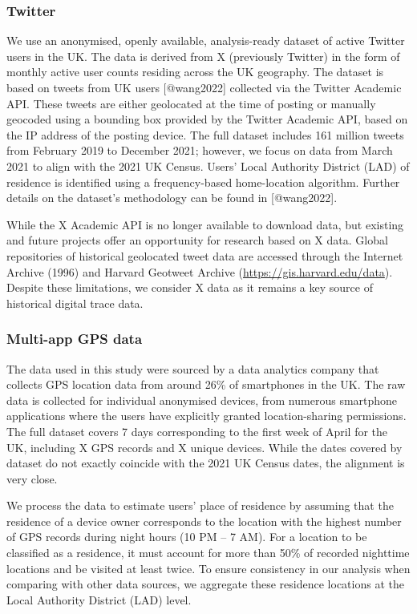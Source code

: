 \documentclass[]{rsos}%
\begin{document}
\subsubsection{Twitter}\label{twitter}

We use an anonymised, openly available, analysis-ready dataset of active
Twitter users in the UK. The data is derived from X (previously Twitter)
in the form of monthly active user counts residing across the UK
geography. The dataset is based on tweets from UK users {[}@wang2022{]}
collected via the Twitter Academic API. These tweets are either
geolocated at the time of posting or manually geocoded using a bounding
box provided by the Twitter Academic API, based on the IP address of the
posting device. The full dataset includes 161 million tweets from
February 2019 to December 2021; however, we focus on data from March
2021 to align with the 2021 UK Census. Users' Local Authority District
(LAD) of residence is identified using a frequency-based home-location
algorithm. Further details on the dataset's methodology can be found in
{[}@wang2022{]}.

While the X Academic API is no longer available to download data, but
existing and future projects offer an opportunity for research based on
X data. Global repositories of historical geolocated tweet data are
accessed through the Internet Archive (1996) and Harvard Geotweet
Archive (\url{https://gis.harvard.edu/data}). Despite these limitations, we
consider X data as it remains a key source of historical digital trace
data.

\subsubsection{Multi-app GPS data}\label{multi-app-gps-data}

The data used in this study were sourced by a data analytics company
that collects GPS location data from around 26\% of smartphones in the
UK. The raw data is collected for individual anonymised devices, from
numerous smartphone applications where the users have explicitly granted
location-sharing permissions. The full dataset covers 7 days
corresponding to the first week of April for the UK, including X GPS
records and X unique devices. While the dates covered by dataset do not
exactly coincide with the 2021 UK Census dates, the alignment is very
close.

We process the data to estimate users' place of residence by assuming
that the residence of a device owner corresponds to the location with
the highest number of GPS records during night hours (10 PM -- 7 AM). For
a location to be classified as a residence, it must account for more
than 50\% of recorded nighttime locations and be visited at least twice.
To ensure consistency in our analysis when comparing with other data
sources, we aggregate these residence locations at the Local Authority
District (LAD) level.
\end{document}
